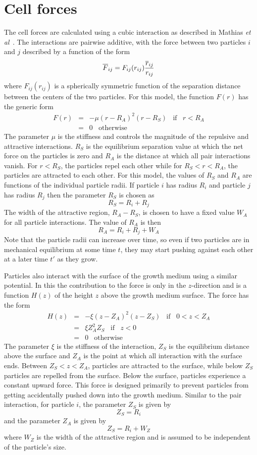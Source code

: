 \documentclass[12pt]{article}
\begin{document}
\section{Cell forces}
The cell forces are calculated using a cubic interaction as described in Mathias
{\em et al}~\cite{Mathias}. The interactions are pairwise
additive, with the force between two particles $i$ and $j$ described by a function of the form
\[
\overline{F}_{ij} = F_{ij}(r_{ij})\frac{\overline{r}_{ij}}{r_{ij}}
\]
where $F_{ij}(r_{ij})$ is a spherically symmetric function of the separation distance between the
centers of the two particles. For this model, the function $F(r)$ has the generic form
\begin{eqnarray*}
F(r) &=& -\mu(r-R_A)^2(r-R_S)\;\;\;\mbox{if}\;\;\;r<R_A \\
& = & 0\;\;\; \mbox{otherwise}
\end{eqnarray*}
The parameter $\mu$ is the stiffness and controls the magnitude of the repulsive and attractive
interactions. $R_S$ is the equilibrium separation value at which the net force on the particles is zero
and $R_A$ is the distance at which all pair interactions vanish. For $r<R_S$, the particles repel each
other while for $R_S<r<R_A$, the particles are attracted to each other. For this model, the values of
$R_S$ and $R_A$ are functions of the individual particle radii. If particle $i$ has radius $R_i$ and
particle $j$ has radius $R_j$ then the parameter $R_S$ is chosen as
\[
R_S = R_i+R_j
\]
The width of the attractive region, $R_A-R_S$, is chosen to have a fixed value $W_A$ for all particle
interactions. The value of $R_A$ is then
\[
R_A = R_i+R_j +W_A
\]
Note that the particle radii can increase over time, so even if two particles are in mechanical
equilibrium at some time $t$, they may start pushing against each other at a later time $t'$ as they
grow.

Particles also interact with the surface of the growth medium using a similar potential. In this
the contribution to the force is only in the $z$-direction and is a function $H(z)$ of the height $z$ above
the growth medium surface. The force has the form
\begin{eqnarray*}
H(z) & = & -\xi (z-Z_A)^2(z-Z_S)\;\;\;\mbox{if}\;\;\;0<z<Z_A \\
& = & \xi Z_A^2Z_S\;\;\;\mbox{if}\;\;\;z<0 \\
& = & 0\;\;\;\mbox{otherwise}
\end{eqnarray*}
The parameter $\xi$ is the stiffness of the interaction, $Z_S$ is the equilibrium distance above the surface
and $Z_A$ is the point at which all interaction with the surface ends. Between $Z_S<z<Z_A$, particles are
attracted to the surface, while below $Z_S$ particles are repelled from the surface. Below the surface,
particles experience a constant upward force. This force is designed primarily to prevent particles from
getting accidentally pushed down into the growth medium. Similar to the pair interaction, for particle $i$,
the parameter $Z_S$ is given by
\[
Z_S = R_i
\]
and the parameter $Z_A$ is given by
\[
Z_S = R_i + W_Z
\]
where $W_Z$ is the width of the attractive region and is assumed to be independent of the particle's size.
\end{document}
